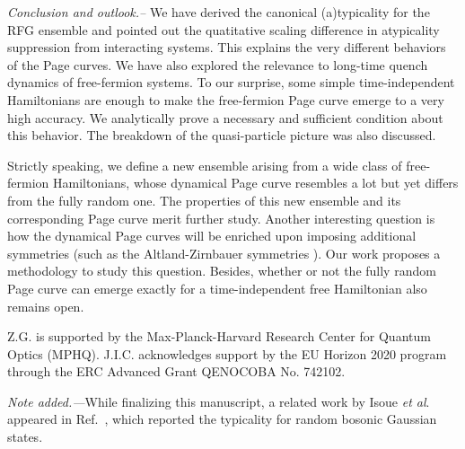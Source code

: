\documentclass[twocolumn,english,prl,aps,superscriptaddress,amsmath,amssymb,floatfix]{revtex4-2}
\begin{document}
\emph{Conclusion and outlook.--}%
We have derived the canonical
(a)typicality for the RFG ensemble %
and pointed out the quatitative %
scaling difference in atypicality suppression %
from %
interacting systems. This %
explains the very different behaviors of the Page curves. %
We have also explored the relevance to long-time quench dynamics of %
free-fermion systems. %
To our surprise, some simple time-independent
Hamiltonians are enough to 
make %
the free-fermion Page curve %
emerge to a very high accuracy. 
We %
analytically prove a necessary and sufficient condition about this behavior. The breakdown %
of the quasi-particle picture was also discussed.

Strictly speaking, we define a new %
ensemble arising from %
a wide class of free-fermion Hamiltonians, whose dynamical Page curve resembles a lot but yet differs from %
the fully random one. %
The properties of this new ensemble and its corresponding Page curve %
merit further study. Another interesting question is how the %
dynamical Page curves will be enriched upon imposing %
additional symmetries (such as the Altland-Zirnbauer symmetries \cite{Altland1997}). %
Our work proposes a methodology to study this question. Besides, whether
or not the fully random Page curve can emerge exactly for a time-independent free Hamiltonian %
also remains open.

Z.G. is supported by the Max-Planck-Harvard Research Center for Quantum Optics (MPHQ). J.I.C. acknowledges support by the EU Horizon 2020 program through the ERC Advanced Grant QENOCOBA No. 742102.

\emph{Note added.---}While finalizing this manuscript, a related
work by Isoue \emph{et al}. appeared in Ref.~\cite{Iosue2022}, which reported the %
typicality for random bosonic Gaussian states.






\end{document}
